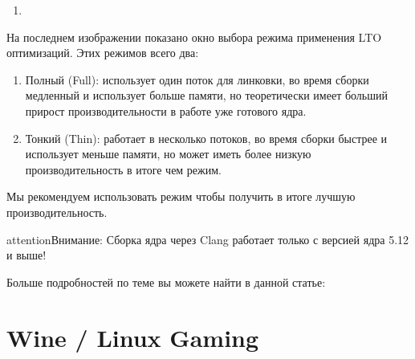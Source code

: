 \documentclass[letterpaper,10pt,russian,openany]{sphinxmanual}
\begin{document}
\noindent{}
\begin{enumerate}
%
\setcounter{enumi}{2}
\item {} 
\end{enumerate}

\noindent{}

\sphinxAtStartPar
На последнем изображении показано окно выбора режима применения LTO оптимизаций.
Этих режимов всего два:
\begin{enumerate}
%
\item {} 
\sphinxAtStartPar
Полный (Full): использует один поток для линковки, во время сборки медленный и использует больше памяти,
но теоретически имеет больший прирост производительности в работе уже готового ядра.

\item {} 
\sphinxAtStartPar
Тонкий (Thin): работает в несколько потоков, во время сборки быстрее и использует меньше памяти, но может иметь более низкую производительность в итоге чем  режим.

\end{enumerate}

\sphinxAtStartPar
Мы рекомендуем использовать  режим чтобы получить в итоге лучшую производительность.

\begin{sphinxadmonition}{attention}{Внимание:}
\sphinxAtStartPar
Сборка ядра через Clang работает только с версией ядра 5.12 и выше!
\end{sphinxadmonition}

\sphinxAtStartPar
Больше подробностей по теме вы можете найти в данной статье:

\sphinxAtStartPar
{}

\sphinxstepscope


\chapter{Wine / Linux Gaming}
\label{\detokenize{source/linux-gaming:wine-linux-gaming}}\label{\detokenize{source/linux-gaming:linux-gaming}}\label{\detokenize{source/linux-gaming::doc}}
\ignorespaces 
\end{document}
